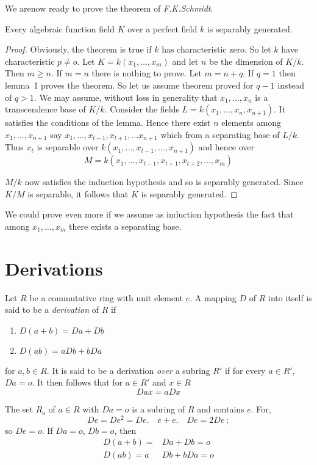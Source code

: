 We are\pageoriginale now ready to prove the theorem of \textit
{F.K.Schmidt}. 

\begin{thm}\label{c3:thm2}%
 Every algebraic function field $K$ over a perfect field $k$ is
 separably generated. 
\end{thm}

\begin{proof}
Obviously, the theorem is true if $k$ has characteristic zero. So let
$k$ have characteristic $p \neq o$. Let $K=k(x_1,\ldots,x_m)$ and let
$n$ be the dimension of $K/k$. Then $m \geq n$. If $m=n$ there is
nothing to prove. Let $m=n+q$. If $q=1$ then lemma~1 proves the
theorem. So let us assume theorem proved for $q-1$ instead of
$q>1$. We may assume, without loss in generality that $x_1,\ldots,x_n$
is a transcendence base of $K/k$. Consider the fields
$L=k(x_1,\ldots,x_n,x_{n+1})$. It satisfies the conditions of the
lemma. Hence there exist $n$ elements among $x_1,\ldots,x_{n+1}$ say
$x_1,\ldots,x_{t-1},x_{t+1},\ldots x_{n+1}$ which from a separating
base of $L/k$. Thus $x_t$ is separable over
$k(x_1,\ldots,x_{t-1},\ldots,x_{n+1})$ and hence over 
$$
M=k(x_1,\ldots,x_{t-1},x_{t+1},x_{t+2},\ldots,x_m)
$$  

$M/k$ now satisfies the induction hypothesis and so is separably
generated. Since $K/M$ is separable, it follows that $K$ is
separably generated. 
\end{proof}

We could prove even more if we assume as induction hypothesis the fact
that among $x_1,\ldots,x_m$ there exists a separating base. 


\section{Derivations}\label{c3:s2}%

Let $R$ be a commutative ring with unit element $\underbar{e}$. A
mapping $D$ of $R$ into itself is said to be a \textit{derivation}
of $R$ if 
\begin{enumerate}
\renewcommand{\labelenumi}{(\theenumi)}
\item $D(a+b)=  Da+Db$\pageoriginale
\item $D(ab) = aDb+bDa$
\end{enumerate}
for $a,b \in R$. It is said to be a derivation \textit{over} a
subring $R'$ if for every $a \in R'$, $Da=o$. It then follows that for
$a \in R'$ and $x \in R$ 
$$
Dax = aDx
$$

The set $R_o$ of $ a \in R$ with $Da=o$ is a subring of $R$ and
contains $\underbar{e}$. For, 
$$
De=De^2=De. \quad  e+e. \quad De=2 De \,;
$$
so $De=o$. If $Da=o$, $Db=o$, then
\begin{align*}
D(a+b)= & Da+Db=o \\
D(ab)= a & Db+bDa=o 
\end{align*}

